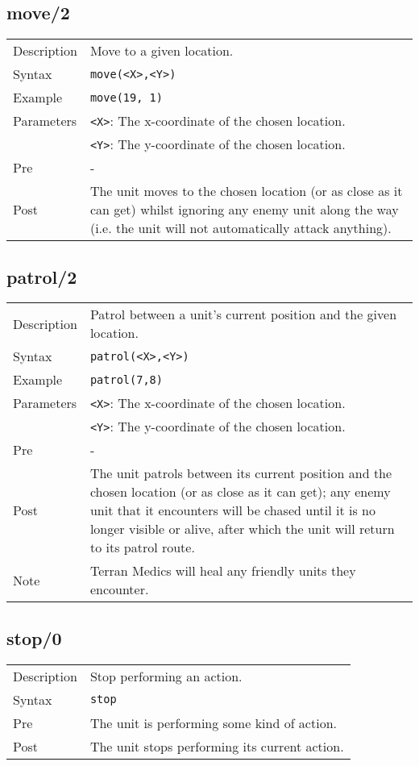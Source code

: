 \subsection{move/2}
\begin{tabularx}{\textwidth}{lX}
 Description & Move to a given location. \\
 Syntax & \verb|move(<X>,<Y>)| \\
 Example & \verb|move(19, 1)| \\
 Parameters & \verb|<X>|: The x-coordinate of the chosen location. \\
            &  \verb|<Y>|: The y-coordinate of the chosen location. \\
 Pre & - \\
 Post & The unit moves to the chosen location (or as close as it can get) whilst ignoring any enemy unit along the way (i.e. the unit will not automatically attack anything).
\end{tabularx}

\subsection{patrol/2}
\begin{tabularx}{\textwidth}{lX}
 Description & Patrol between a unit's current position and the given location. \\
 Syntax & \verb|patrol(<X>,<Y>)| \\
 Example & \verb|patrol(7,8)| \\
 Parameters & \verb|<X>|: The x-coordinate of the chosen location. \\
            &  \verb|<Y>|: The y-coordinate of the chosen location. \\
 Pre & - \\
 Post & The unit patrols between its current position and the chosen location (or as close as it can get); any enemy unit that it encounters will be chased until it is no longer visible or alive, after which the unit will return to its patrol route. \\
 Note & Terran Medics will heal any friendly units they encounter.
\end{tabularx}

\subsection{stop/0}
\begin{tabularx}{\textwidth}{lX}
 Description & Stop performing an action. \\
 Syntax & \verb|stop| \\
 Pre & The unit is performing some kind of action. \\
 Post & The unit stops performing its current action.
\end{tabularx}

